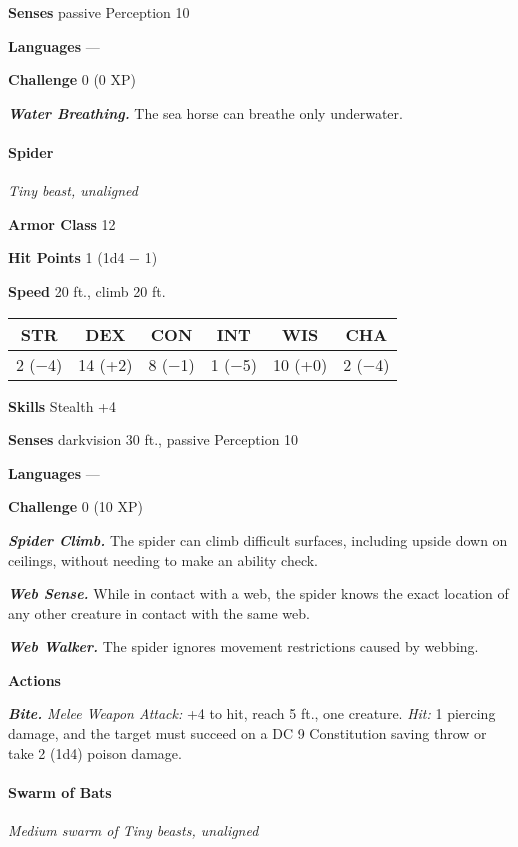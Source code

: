 \documentclass[
]{article}
\begin{document}
\textbf{Senses} passive Perception 10

\textbf{Languages} ---

\textbf{Challenge} 0 (0 XP)

\emph{\textbf{Water Breathing.}} The sea horse can breathe only
underwater.

\hypertarget{spider}{%
\paragraph{Spider}\label{spider}}

\emph{Tiny beast, unaligned}

\textbf{Armor Class} 12

\textbf{Hit Points} 1 (1d4 − 1)

\textbf{Speed} 20 ft., climb 20 ft.

\begin{longtable}[]{@{}cccccc@{}}
\toprule
STR & DEX & CON & INT & WIS & CHA\tabularnewline
\midrule
\endhead
2 (−4) & 14 (+2) & 8 (−1) & 1 (−5) & 10 (+0) & 2 (−4)\tabularnewline
\bottomrule
\end{longtable}

\textbf{Skills} Stealth +4

\textbf{Senses} darkvision 30 ft., passive Perception 10

\textbf{Languages} ---

\textbf{Challenge} 0 (10 XP)

\emph{\textbf{Spider Climb.}} The spider can climb difficult surfaces,
including upside down on ceilings, without needing to make an ability
check.

\emph{\textbf{Web Sense.}} While in contact with a web, the spider knows
the exact location of any other creature in contact with the same web.

\emph{\textbf{Web Walker.}} The spider ignores movement restrictions
caused by webbing.

\textbf{Actions}

\emph{\textbf{Bite.}} \emph{Melee Weapon Attack:} +4 to hit, reach 5
ft., one creature. \emph{Hit:} 1 piercing damage, and the target must
succeed on a DC 9 Constitution saving throw or take 2 (1d4) poison
damage.

\hypertarget{swarm-of-bats}{%
\paragraph{Swarm of Bats}\label{swarm-of-bats}}

\emph{Medium swarm of Tiny beasts, unaligned}
\end{document}
